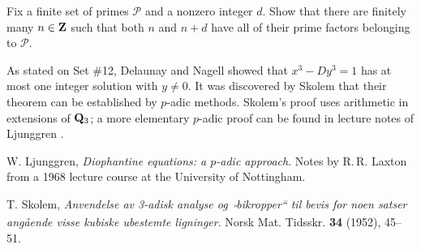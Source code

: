 \begin{challenge}[continuation] Fix a finite set of primes $\mathcal{P}$ and a nonzero integer $d$. Show that there are finitely many $n \in \mathbf{Z}$ such that both $n$ and $n+d$ have all of their prime factors belonging to $\mathcal{P}$.
\end{challenge}


\begin{rmk} As stated on Set \#12, Delaunay and Nagell showed that $x^3-Dy^3=1$ has at most one integer solution with $y\ne 0$. It was discovered by Skolem \cite{skolem} that their theorem can be established by $p$-adic methods. Skolem's proof uses arithmetic in extensions of $\mathbf{Q}_3$; a more elementary $p$-adic proof can be found in lecture notes of Ljunggren \cite{ljunggren}.
\end{rmk}



\let\oldaddcontenttsline\addcontentsline
\renewcommand{\addcontentsline}[3]{}
\begin{thebibliography}{11}
 W. Ljunggren,
\emph{Diophantine equations: a $p$-adic approach}. Notes by {R.\,R.} Laxton from a 1968 lecture course at the University of Nottingham.

 T. Skolem,
\emph{Anvendelse av 3-adisk analyse og \textsubscript{''}bikropper`` til bevis for noen satser angående visse kubiske ubestemte ligninger}. Norsk Mat. Tidsskr. \textbf{34} (1952), 45--51.

\end{thebibliography}
\let\addcontentsline\oldaddcontentsline